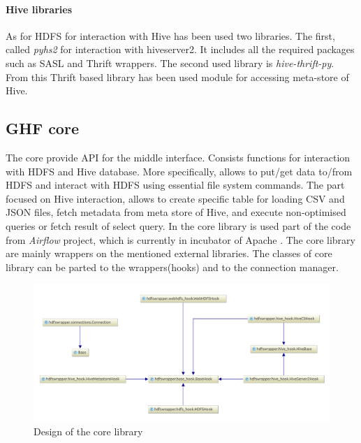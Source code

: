 \documentclass[a4paper,12pt,oneside]{report}
\begin{document}
\paragraph{Hive libraries}
As for HDFS for interaction with Hive has been used two libraries. The first, called \textit{pyhs2} for interaction with hiveserver2. It includes all the required packages such as SASL and Thrift wrappers. The second used library is \textit{hive-thrift-py}. From this Thrift based library has been used module for accessing meta-store of Hive.

\subsection{GHF core}
The core provide API for the middle interface. Consists functions for interaction with HDFS and Hive database. More specifically, allows to put/get data to/from HDFS and interact with HDFS using essential file system commands. The part focused on Hive interaction, allows to create specific table for loading CSV and JSON files, fetch metadata from meta store of Hive, and execute non-optimised queries or fetch result of select query. In the core library is used part of the code from \textit{Airflow} project, which is currently in incubator of Apache \cite{airflow_diff}. The core library are mainly wrappers on the mentioned external libraries. The classes of core library can be parted to the  wrappers(hooks) and to the connection manager. 

\begin{figure}[!htbp]
   \centering
   \includegraphics[width=1\textwidth]{./img/diag1_small.pdf}
   \caption[Core diagram]{\centering Design of the core library }
\end{figure} 
\end{document}

